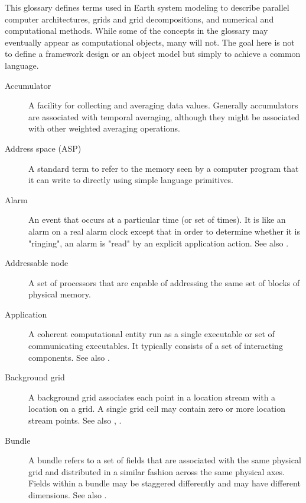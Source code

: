 
\label{sec:glos}

This glossary defines terms used in Earth system modeling to describe 
parallel computer architectures, grids and grid decompositions, and 
numerical and computational methods.  While some of the concepts in 
the glossary may eventually appear as computational objects, many 
will not.  The goal here is not to define a framework design or an 
object model but simply to achieve a common language.

\begin{description}

\item[Accumulator] \label{glos:Accumulator} A facility for collecting and 
  averaging data values.  Generally accumulators are associated with 
  temporal averaging, although they might be associated with 
  other weighted averaging operations.    
  
\item[Address space (ASP)] \label{glos:ASP}A standard term to refer to the memory
  seen by a computer program that it can write to directly using
  simple language primitives. 

\item[Alarm] \label{glos:Alarm} An event that occurs at a particular 
  time (or set of times).  It is like an alarm on a real alarm clock 
  except that in order to determine whether it is "ringing", an alarm 
  is "read" by an explicit application action.
  See also .

\item[Addressable node] \label{glos:Anode} A set of processors that are
  capable of addressing the same set of blocks of physical memory.

\item[Application] \label{glos:Application} A coherent computational 
  entity run as a single executable or set of communicating executables.  
  It typically consists of a set of interacting components.  
  See also .

\item[Background grid] \label{glos:BackGrid} 
  A background grid associates each point in a location stream with a 
  location on a grid. A single grid cell may contain zero or more location 
  stream points. See also , . 

\item[Bundle] \label{glos:Bundle} A bundle refers to a set of fields that 
  are associated with the same physical grid and distributed in a similar 
  fashion across the same physical axes.  Fields within a bundle may be
  staggered differently and may have different dimensions. 
  See also . 


\end{description}
